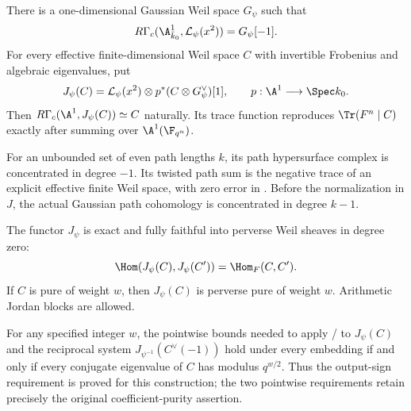 \begin{finding}
\label{f:gaussiansign}
There is a one-dimensional Gaussian Weil space $G_\psi$ such that
\[
 R\Gamma_c(\A^1_{\bar k_0},\mathcal L_\psi(x^2))=G_\psi[-1].
\]
For every effective finite-dimensional Weil space $C$ with invertible
Frobenius and algebraic eigenvalues, put
\[
 J_\psi(C)=\mathcal L_\psi(x^2)\otimes
                p^*(C\otimes G_\psi^\vee)[1],
 \qquad p:\A^1\longrightarrow\Spec k_0.
\]
Then $R\Gamma_c(\A^1,J_\psi(C))\simeq C$ naturally. Its trace
function reproduces $\Tr(F^n\mid C)$ exactly after summing over
$\A^1(\F_{q^n})$.

For an unbounded set of even path lengths $k$, its path
hypersurface complex is concentrated in degree $-1$. Its twisted
path sum is the negative trace of an explicit effective finite Weil
space, with zero error in . Before the normalization in $J$,
the actual Gaussian path cohomology is concentrated in degree $k-1$.

The functor $J_\psi$ is exact and fully faithful into perverse
Weil sheaves in degree zero:
\[
 \Hom(J_\psi(C),J_\psi(C'))=\Hom_F(C,C').
\]
If $C$ is pure of weight $w$, then $J_\psi(C)$ is perverse pure
of weight $w$. Arithmetic Jordan blocks are allowed.

For any specified integer $w$, the pointwise bounds needed to
apply / to $J_\psi(C)$ and the reciprocal system
$J_{\psi^{-1}}(C^\vee(-1))$ hold under every embedding if and only if
every conjugate eigenvalue of $C$ has modulus $q^{w/2}$.
Thus the output-sign requirement is proved for this construction;
the two pointwise requirements retain precisely the original
coefficient-purity assertion.
\end{finding}

